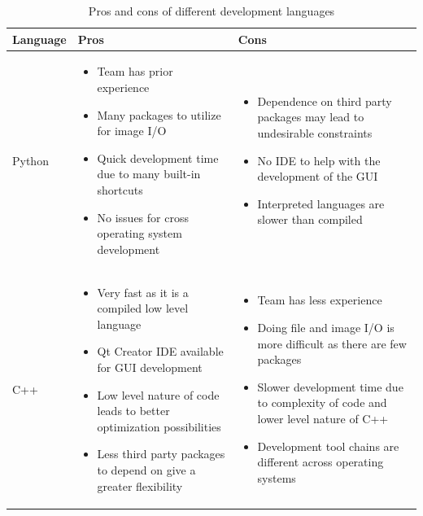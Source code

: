 \documentclass{article}
\begin{document}
      \begin{center}
      \begin{table}[!ht]
      \caption{Pros and cons of different development languages}
      \begin{tabular}{ | l | p{5cm} | p{5cm} |}
        \hline			
        Language & Pros & Cons \\
        \hline
        Python 
        
        & 

		\begin{itemize}
          \item Team has prior experience
          \item Many packages to utilize for image I/O
          \item Quick development time due to many built-in shortcuts
          \item No issues for cross operating system development
        \end{itemize}

		& 

        \begin{itemize}
          \item Dependence on third party packages may lead to undesirable constraints  
          \item No IDE to help with the development of the GUI
          \item Interpreted languages are slower than compiled
        \end{itemize}

 		\\
        \hline
        C++
        
        & 

		\begin{itemize}
          \item Very fast as it is a compiled low level language
          \item Qt Creator IDE available for GUI development
          \item Low level nature of code leads to better optimization possibilities
          \item Less third party packages to depend on give a greater flexibility
        \end{itemize}

		& 

        \begin{itemize}
          \item Team has less experience
          \item Doing file and image I/O is more difficult as there are few packages
          \item Slower development time due to complexity of code and lower level nature of C++
          \item Development tool chains are different across operating systems
        \end{itemize}

 		\\
        \hline  
      \end{tabular}
      \end{table}
      \end{center}
      
\end{document}
